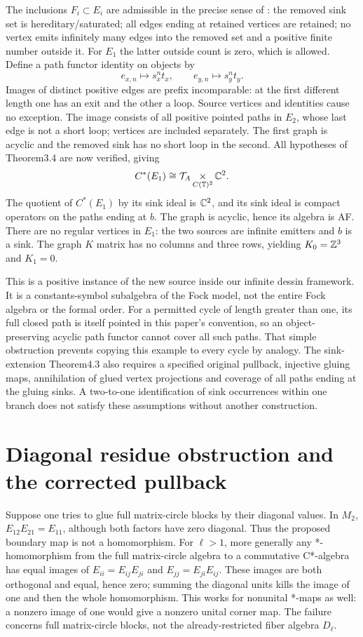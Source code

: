 The inclusions $F_i\subset E_i$ are admissible in the precise sense of \cite[Definition3.1]{GraphPullbacks}: the removed sink set is hereditary/saturated; all edges ending at retained vertices are retained; no vertex emits infinitely many edges into the removed set and a positive finite number outside it. For $E_1$ the latter outside count is zero, which is allowed. Define a path functor identity on objects by
\[
 e_{x,n}\longmapsto s_x^nt_x,\qquad
 e_{y,n}\longmapsto s_y^nt_y.
\]
Images of distinct positive edges are prefix incomparable: at the first different length one has an exit and the other a loop. Source vertices and identities cause no exception. The image consists of all positive pointed paths in $E_2$, whose last edge is not a short loop; vertices are included separately. The first graph is acyclic and the removed sink has no short loop in the second. All hypotheses of Theorem3.4 are now verified, giving
\[
 C^*(E_1)\cong\mathcal T_A\mathop{\times}_{C(\mathbb T)^2}\mathbb C^2.
\]
The quotient of $C^*(E_1)$ by its sink ideal is $\mathbb C^2$, and its sink ideal is compact operators on the paths ending at $b$. The graph is acyclic, hence its algebra is AF. There are no regular vertices in $E_1$: the two sources are infinite emitters and $b$ is a sink. The graph $K$ matrix has no columns and three rows, yielding $K_0=\mathbb Z^3$ and $K_1=0$.

This is a positive instance of the new source inside our infinite dessin framework. It is a constants-symbol subalgebra of the Fock model, not the entire Fock algebra or the formal order. For a permitted cycle of length greater than one, its full closed path is itself pointed in this paper's convention, so an object-preserving acyclic path functor cannot cover all such paths. That simple obstruction prevents copying this example to every cycle by analogy. The sink-extension Theorem4.3 also requires a specified original pullback, injective gluing maps, annihilation of glued vertex projections and coverage of all paths ending at the gluing sinks. A two-to-one identification of sink occurrences within one branch does not satisfy these assumptions without another construction.

\section{Diagonal residue obstruction and the corrected pullback}
Suppose one tries to glue full matrix-circle blocks by their diagonal values. In $M_2$, $E_{12}E_{21}=E_{11}$, although both factors have zero diagonal. Thus the proposed boundary map is not a homomorphism. For $\ell>1$, more generally any *-homomorphism from the full matrix-circle algebra to a commutative C*-algebra has equal images of $E_{ii}=E_{ij}E_{ji}$ and $E_{jj}=E_{ji}E_{ij}$. These images are both orthogonal and equal, hence zero; summing the diagonal units kills the image of one and then the whole homomorphism. This works for nonunital *-maps as well: a nonzero image of one would give a nonzero unital corner map. The failure concerns full matrix-circle blocks, not the already-restricted fiber algebra $D_\ell$.

